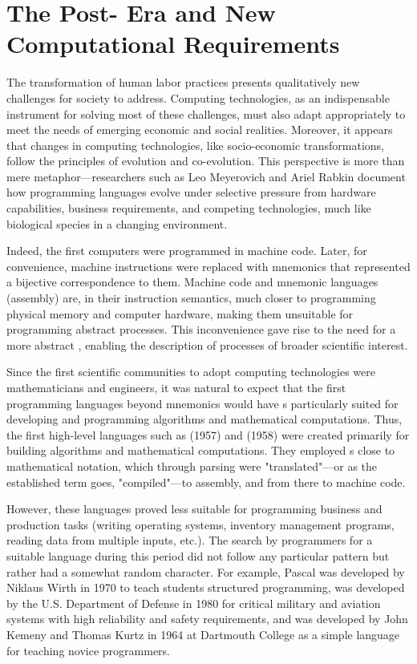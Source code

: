 \section{The Post- Era and New Computational Requirements}

The transformation of human labor practices presents qualitatively new challenges for society to address.
Computing technologies, as an indispensable instrument for solving most of these challenges, must also
adapt appropriately to meet the needs of emerging economic and social realities.
Moreover, it appears that changes in computing technologies, like socio-economic transformations, follow
the principles of evolution and co-evolution. This perspective is more than mere metaphor—researchers such as Leo Meyerovich and Ariel Rabkin \cite{meyerovichrabkin} document how programming languages evolve under selective pressure from hardware capabilities, business requirements, and competing technologies, much like biological species in a changing environment.

Indeed, the first computers were programmed in machine code.
Later, for convenience, machine instructions were replaced with mnemonics that represented a bijective correspondence to them.
Machine code and mnemonic languages (assembly) are, in their instruction semantics, much closer to programming
physical memory and computer hardware, making them unsuitable for programming abstract processes.
This inconvenience gave rise to the need for a more abstract , enabling
the description of processes of broader scientific interest.

Since the first scientific communities to adopt computing
technologies were mathematicians and engineers, it was natural to expect that the first
programming languages beyond mnemonics would have s particularly suited for developing and programming
algorithms and mathematical computations. Thus, the first high-level languages such as  (1957) and  (1958) were created primarily
for building algorithms and mathematical computations. They employed s close to mathematical notation,
which through parsing were "translated"—or as the established term goes, "compiled"—to assembly, and from there to machine code.

However, these languages proved less suitable for programming business and production tasks
(writing operating systems, inventory management programs, reading data from multiple inputs, etc.).
The search by programmers for a suitable language during this period did not follow any particular pattern but rather
had a somewhat random character. For example, Pascal was developed by Niklaus Wirth in 1970 to teach students structured programming,
 was developed by the U.S. Department of Defense in 1980 for critical military and aviation systems with high reliability and safety requirements,
and  was developed by John Kemeny and Thomas Kurtz in 1964 at Dartmouth College as a simple language for teaching novice programmers.

